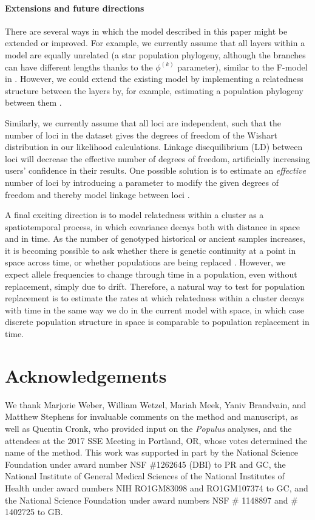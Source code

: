 \documentclass[12pt]{article}
\begin{document}
\paragraph{Extensions and future directions}
There are several ways in which the model described in this paper might be extended or improved.  
For example, we currently assume that all layers within a model are equally unrelated 
(a star population phylogeny, although the branches can have different lengths thanks to the $\phi^{(k)}$ parameter), 
similar to the F-model in \citep{falush2003}.
However, we could extend the existing model by implementing 
a relatedness structure between the layers by, for example, 
estimating a population phylogeny between them \citep[e.g.][]{treemix}.

Similarly, we currently assume that all loci are independent, 
such that the number of loci in the dataset gives the degrees of 
freedom of the Wishart distribution in our likelihood calculations.  
Linkage disequilibrium (LD) between loci will decrease 
the effective number of degrees of freedom, 
artificially increasing users' confidence in their results.  
One possible solution is to estimate an \emph{effective} number of loci 
by introducing a parameter to modify the given degrees of freedom 
and thereby model linkage between loci \citep[e.g.][]{EEMS}.

A final exciting direction is to model relatedness within a cluster as a spatiotemporal process, 
in which covariance decays both with distance in space and in time.  
As the number of genotyped historical or ancient samples increases, 
it is becoming possible to ask whether there is genetic continuity at a point in space across time, 
or whether populations are being replaced \citep{lazaridis_ancient_2014, Haak2015, slatkin_racimo2016, Nielsen2017, Schraiber2017}.
However, we expect allele frequencies to change through time in a population, even without replacement, 
simply due to drift.
Therefore, a natural way to test for population replacement is to estimate the rates 
at which relatedness within a cluster decays with time in the same way we do in the current model with space, 
in which case discrete population structure in space is comparable to population replacement in time.

\section*{Acknowledgements}

We thank Marjorie Weber, William Wetzel, Mariah Meek, Yaniv Brandvain, and Matthew Stephens 
for invaluable comments on the method and manuscript, 
as well as Quentin Cronk, who provided input on the \textit{Populus} analyses, 
and the attendees at the 2017 SSE Meeting in Portland, OR, 
whose votes determined the name of the method.
This work was supported in part by 
the National Science Foundation under award number NSF \#1262645 (DBI) to PR and GC, 
the National Institute of General Medical Sciences of the National Institutes of Health under award numbers NIH RO1GM83098 and RO1GM107374 to GC,
and the National Science Foundation under award numbers NSF \# 1148897 and \# 1402725 to GB.
\end{document}
